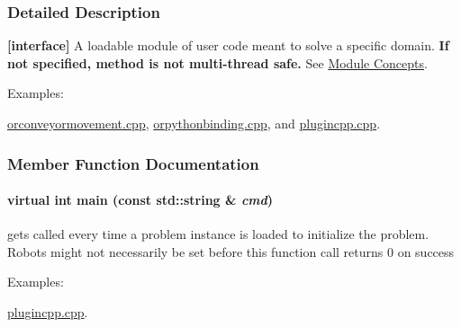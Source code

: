 \subsubsection{Detailed Description}
{\bfseries \mbox{[}interface\mbox{]}} A loadable module of user code meant to solve a specific domain. {\bfseries If not specified, method is not multi-\/thread safe.} See \hyperlink{arch__module}{Module Concepts}. \begin{Desc}
\item[Examples: ]\par


\hyperlink{orconveyormovement_8cpp-example}{orconveyormovement.cpp}, \hyperlink{orpythonbinding_8cpp-example}{orpythonbinding.cpp}, and \hyperlink{plugincpp_8cpp-example}{plugincpp.cpp}.

\end{Desc}


\subsubsection{Member Function Documentation}
\hypertarget{classOpenRAVE_1_1ModuleBase_a9272536a00bca7f32ec0e4a7e131ac23}{
\paragraph[{main}]{\setlength{\rightskip}{0pt plus 5cm}virtual int main (const std::string \& {\em cmd})}\hfill}
\label{classOpenRAVE_1_1ModuleBase_a9272536a00bca7f32ec0e4a7e131ac23}
gets called every time a problem instance is loaded to initialize the problem. Robots might not necessarily be set before this function call returns 0 on success \begin{Desc}
\item[Examples: ]\par
\hyperlink{plugincpp_8cpp-example}{plugincpp.cpp}.\end{Desc}

